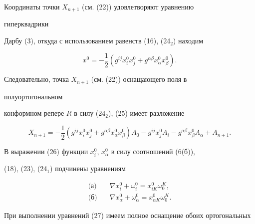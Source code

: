 \addtocounter{equation}{1} 


 


Координаты точки $X_{n+1}$ (см. (22)) удовлетворяют уравнению 


гиперквадрики 


Дарбу (3), откуда с использованием равенств (16), (24$_2$) находим 


\begin{equation} 


x^0=-\frac{1}{2}(g^{ij}x^0_i x^0_j+g^{\alpha\beta} 


x^0_\alpha x^0_\beta). 


\end{equation} 


Следовательно, точка $X_{n+1}$ (см. (22)) оснащающего поля в 


полуортогональном 


конформном репере $R$ в силу (24$_2$), (25) имеет разложение 


\begin{equation} 


X_{n+1}=-\frac{1}{2}(g^{ij}x^0_i x^0_j+g^{\alpha\beta} 


x^0_\alpha x^0_\beta)A_0-g^{ij}x^0_j A_i- 


g^{\alpha\beta}x^0_\beta A_\alpha+A_{n+1}. 


\end{equation} 


 


В выражении (26) функции $x^0_i$, $x^0_\alpha$ в силу соотношений (6(б)), 


(18), (23), (24$_1$) подчинены уравнениям 


\begin{equation} 


\begin{split} 


\text{(а)}\quad & \nabla x^0_i+\omega^0_i= 


x^0_{iK}\omega^K_0,\\ 


\text{(б)}\quad & \nabla x^0_\alpha+\omega^0_\alpha= 


x^0_{\alpha K}\omega^K_0. 


\end{split} 


\end{equation} 


При выполнении уравнений (27) имеем полное оснащение обоих ортогональных 


